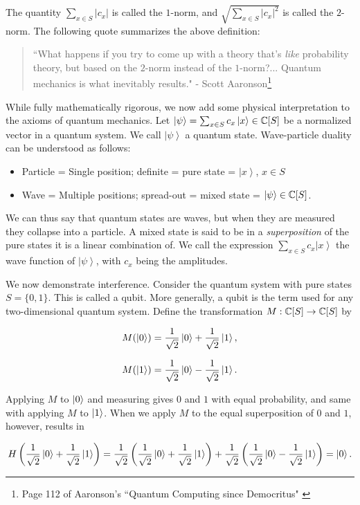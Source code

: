 \documentclass{article}
\theoremstyle{definition}
\numberwithin{figure}{section}
\begin{document}
The quantity $\sum_{x\in S}|c_x|$ is called the $1$-norm, and $\sqrt{\sum_{x\in S}|c_x|^2}$ is called the $2$-norm. The following quote summarizes the above definition:

\begin{quote}
``What happens if you try to come up with a theory that's \textit{like} probability theory, but based on the $2$-norm instead of the $1$-norm?... Quantum mechanics is what inevitably results." - Scott Aaronson\footnote{Page 112 of Aaronson's ``Quantum Computing since Democritus" \cite{aaronson2013quantum}}
\end{quote}

While fully mathematically rigorous, we now add some physical interpretation to the axioms of quantum mechanics. Let $\left|\psi\right>=\sum_{x\in S}c_x\left|x\right>\in \mathbb{C}[S]$ be a normalized vector in a quantum system. We call $\left|\psi\right>$ a quantum state. Wave-particle duality can be understood as follows:

\begin{itemize}
\item Particle = Single position; definite = pure state = $\left|x\right>$, $x\in S$
\item Wave = Multiple positions; spread-out = mixed state = $\left|\psi\right>\in \mathbb{C}[S]$.
\end{itemize}

We can thus say that quantum states are waves, but when they are measured they collapse into a particle. A mixed state is said to be in a \textit{superposition} of the pure states it is a linear combination of. We call the expression $\sum_{x\in S}c_x \left|x\right>$ the wave function of $\left|\psi\right>$, with $c_x$ being the amplitudes.

We now demonstrate interference. Consider the quantum system with pure states $S=\{0,1\}$. This is called a qubit. More generally, a qubit is the term used for any two-dimensional quantum system. Define the transformation $M: \mathbb{C}[S]\to \mathbb{C}[S]$ by

$$M(\left|0\right>)=\frac{1}{\sqrt{2}}\left|0\right>+\frac{1}{\sqrt{2}}\left|1\right>,$$

$$M(\left|1\right>)=\frac{1}{\sqrt{2}}\left|0\right>-\frac{1}{\sqrt{2}}\left|1\right>.$$

Applying $M$ to $\left|0\right>$ and measuring gives $0$ and $1$ with equal probability, and same with applying $M$ to $\left|1\right>$. When we apply $M$ to the equal superposition of $0$ and $1$, however, results in

$$H\left(\frac{1}{\sqrt{2}}\left|0\right>+\frac{1}{\sqrt{2}}\left|1\right>\right)=\frac{1}{\sqrt{2}}\left(\frac{1}{\sqrt{2}}\left|0\right>+\frac{1}{\sqrt{2}}\left|1\right>\right)+\frac{1}{\sqrt{2}}\left(\frac{1}{\sqrt{2}}\left|0\right>-\frac{1}{\sqrt{2}}\left|1\right>\right)=\left|0\right>.$$
\end{document}
